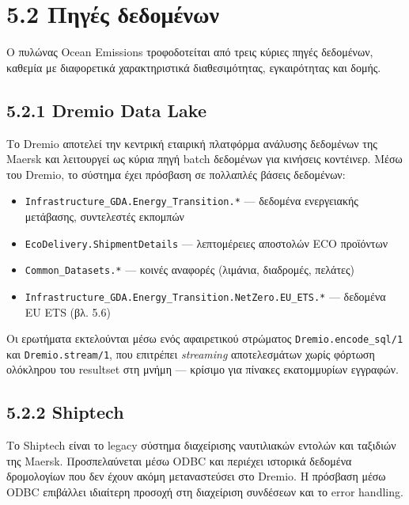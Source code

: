 \section{5.2 Πηγές
δεδομένων}\label{ux3c0ux3b7ux3b3ux3adux3c2-ux3b4ux3b5ux3b4ux3bfux3bcux3adux3bdux3c9ux3bd}

Ο πυλώνας Ocean Emissions τροφοδοτείται από τρεις κύριες πηγές
δεδομένων, καθεμία με διαφορετικά χαρακτηριστικά διαθεσιμότητας,
εγκαιρότητας και δομής.

\subsection{5.2.1 Dremio Data Lake}\label{dremio-data-lake}

Το Dremio αποτελεί την κεντρική εταιρική πλατφόρμα ανάλυσης δεδομένων
της Maersk και λειτουργεί ως κύρια πηγή batch δεδομένων για κινήσεις
κοντέινερ. Μέσω του Dremio, το σύστημα έχει πρόσβαση σε πολλαπλές βάσεις
δεδομένων:

\begin{itemize}
\tightlist
\item
  \texttt{Infrastructure\_GDA.Energy\_Transition.*} --- δεδομένα
  ενεργειακής μετάβασης, συντελεστές εκπομπών
\item
  \texttt{EcoDelivery.ShipmentDetails} --- λεπτομέρειες αποστολών ECO
  προϊόντων
\item
  \texttt{Common\_Datasets.*} --- κοινές αναφορές (λιμάνια, διαδρομές,
  πελάτες)
\item
  \texttt{Infrastructure\_GDA.Energy\_Transition.NetZero.EU\_ETS.*} ---
  δεδομένα EU ETS (βλ. 5.6)
\end{itemize}

Οι ερωτήματα εκτελούνται μέσω ενός αφαιρετικού στρώματος
\texttt{Dremio.encode\_sql/1} και \texttt{Dremio.stream/1}, που
επιτρέπει \emph{streaming} αποτελεσμάτων χωρίς φόρτωση ολόκληρου του
resultset στη μνήμη --- κρίσιμο για πίνακες εκατομμυρίων εγγραφών.

\subsection{5.2.2 Shiptech}\label{shiptech}

Το Shiptech είναι το legacy σύστημα διαχείρισης ναυτιλιακών εντολών και
ταξιδιών της Maersk. Προσπελαύνεται μέσω ODBC και περιέχει ιστορικά
δεδομένα δρομολογίων που δεν έχουν ακόμη μεταναστεύσει στο Dremio. Η
πρόσβαση μέσω ODBC επιβάλλει ιδιαίτερη προσοχή στη διαχείριση συνδέσεων
και το error handling.

